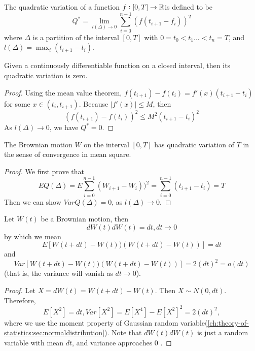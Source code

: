 \begin{refsection}
\begin{definition}\cite[101]{joshi2003concepts}
	The quadratic variation of a function $f:[0,T]\rightarrow \mathbb{R}$is defined to be 
	$$Q^*=\lim_{l(\Delta)\rightarrow 0} \sum_{i=0}^{n-1}(f(t_{i+1}-f_i))^2$$
	where $\Delta$ is a partition of the interval $[0,T]$ with $0=t_0<t_1...<t_n =T$, and $l(\Delta)=\max_i(t_{i+1}-t_i)$.
\end{definition}


\begin{theorem}\cite[101]{joshi2003concepts}\hfill
	Given a continuously differentiable function on a closed interval, then its quadratic variation is zero.
\end{theorem}
\begin{proof}
	Using the mean value theorem, $f(t_{i+1})-f(t_i)=f'(x)(t_{i+1}-t_i)$ for some $x\in (t_i,t_{i+1})$.
	Because $|f'(x)|\leq M$, then
	$$(f(t_{i+1})-f(t_i))^2 \leq M^2(t_{i+1}-t_i)^2$$
	As $l(\Delta)\rightarrow 0$, we have $Q^* = 0$.	
\end{proof}

\begin{theorem}\cite[102]{joshi2003concepts}
	The Brownian motion $W$ on the interval $[0,T]$ has quadratic variation of $T$ in the sense of convergence in mean square.\cite{shreve2004stochastic2}
\end{theorem}
\begin{proof}
	We first prove that
	$$EQ(\Delta) = E\sum_{i=0}^{n-1}(W_{i+1}-W_i))^2 =\sum_{i=0}^{n-1} (t_{i+1}-t_i)=T  $$
	Then we can show $VarQ(\Delta) = 0$, as $l(\Delta)\rightarrow 0$. 
\end{proof}

\begin{lemma}
	Let $W(t)$ be a Brownian motion, then
	$$dW(t)dW(t)=dt, dt\to 0$$
	by which we mean
	$$E[W(t+dt)-W(t))(W(t+dt)-W(t))] = dt$$ and
	$$Var[W(t+dt)-W(t))(W(t+dt)-W(t))] = 2(dt)^2 = o(dt) $$ (that is, the variance will vanish as $dt \rightarrow 0$).
\end{lemma}
\begin{proof}
	Let $X=dW(t) = W(t+dt)-W(t)$. Then $X \sim N(0,dt)$. Therefore, 
	$$E[X^2] = dt, Var[X^2] = E[X^4] - E[X^2]^2 = 2(dt)^2,$$
	where we use the moment property of Gaussian random variable(\autoref{ch:theory-of-statistics:sec:normaldistribution}). 
	Note that
	$dW(t)dW(t)$ is just a random variable with mean $dt$, and variance approaches 0 .	
\end{proof}


\end{refsection}
